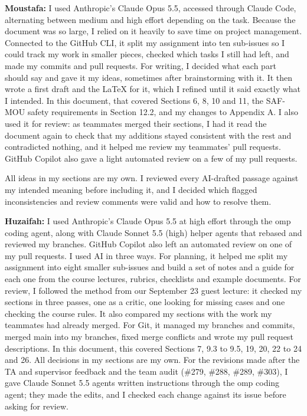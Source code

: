 \documentclass[12pt]{article}
\renewcommand{\_}{\textunderscore\allowbreak}%
\begin{document}
\textbf{Moustafa:} I used Anthropic's Claude Opus 5.5, accessed through Claude
Code, alternating between medium and high effort depending on the task. Because
the document was so large, I relied on it heavily to save time on project
management. Connected to the GitHub CLI, it split my assignment into ten
sub-issues so I could track my work in smaller pieces, checked which tasks I
still had left, and made my commits and pull requests. For writing, I decided
what each part should say and gave it my ideas, sometimes after brainstorming
with it. It then wrote a first draft and the \LaTeX{} for it, which I refined
until it said exactly what I intended. In this document, that covered Sections
6, 8, 10 and 11, the SAF-MOU safety requirements in Section 12.2, and my changes
to Appendix A. I also used it for review: as teammates merged their sections, I
had it read the document again to check that my additions stayed consistent with
the rest and contradicted nothing, and it helped me review my teammates' pull
requests. GitHub Copilot also gave a light automated review on a few of my pull
requests.

All ideas in my sections are my own. I reviewed every AI-drafted passage against
my intended meaning before including it, and I decided which flagged
inconsistencies and review comments were valid and how to resolve them.

\textbf{Huzaifah:} I used Anthropic's Claude Opus 5.5 at high effort through the
omp coding agent, along with Claude Sonnet 5.5 (high) helper agents that rebased
and reviewed my branches. GitHub Copilot also left an automated review on one of
my pull requests. I used AI in three ways. For planning, it helped me split my
assignment into eight smaller sub-issues and build a set of notes and a guide
for each one from the course lectures, rubrics, checklists and example
documents. For review, I followed the method from our September 23 guest
lecture: it checked my sections in three passes, one as a critic, one looking
for missing cases and one checking the course rules. It also compared my
sections with the work my teammates had already merged. For Git, it managed my
branches and commits, merged main into my branches, fixed merge conflicts and
wrote my pull request descriptions. In this document, this covered Sections 7,
9.3 to 9.5, 19, 20, 22 to 24 and 26. All decisions in my sections are my own.
For the revisions made after the TA and supervisor feedback and the team audit (\#279, \#288, \#289, \#303), I gave Claude Sonnet 5.5 agents written instructions through the omp coding agent; they made the edits, and I checked each change against its issue before asking for review.
\end{document}
